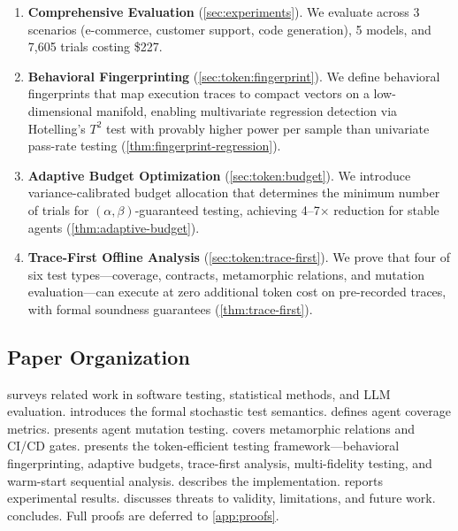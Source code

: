 \begin{enumerate}[leftmargin=*,label=\textbf{C\arabic*.}]
  \item \textbf{Comprehensive Evaluation} (\cref{sec:experiments}). We
    evaluate \agentassay{} across 3 scenarios (e-commerce, customer
    support, code generation), 5 models, and 7{,}605 trials costing
    \$227.

  \item \textbf{Behavioral Fingerprinting}
    (\cref{sec:token:fingerprint}). We define behavioral fingerprints
    that map execution traces to compact vectors on a low-dimensional
    manifold, enabling multivariate regression detection via
    Hotelling's $T^2$ test with provably higher power per sample than
    univariate pass-rate testing
    (\cref{thm:fingerprint-regression}).

  \item \textbf{Adaptive Budget Optimization}
    (\cref{sec:token:budget}). We introduce variance-calibrated budget
    allocation that determines the minimum number of trials for
    $(\alpha, \beta)$-guaranteed testing, achieving 4--7$\times$
    reduction for stable agents (\cref{thm:adaptive-budget}).

  \item \textbf{Trace-First Offline Analysis}
    (\cref{sec:token:trace-first}). We prove that four of six test
    types---coverage, contracts, metamorphic relations, and
    mutation evaluation---can execute at zero additional token cost on
    pre-recorded traces, with formal soundness guarantees
    (\cref{thm:trace-first}).
\end{enumerate}

\subsection{Paper Organization}
\label{sec:intro:organization}

 surveys related work in software testing, statistical
methods, and LLM evaluation.  introduces the formal
stochastic test semantics.  defines agent coverage
metrics.  presents agent mutation testing.
 covers metamorphic relations and CI/CD gates.
 presents the token-efficient testing
framework---behavioral fingerprinting, adaptive budgets, trace-first
analysis, multi-fidelity testing, and warm-start sequential analysis.
 describes the \agentassay{} implementation.
 reports experimental results.
 discusses threats to validity, limitations, and
future work.  concludes. Full proofs are deferred
to \cref{app:proofs}.
